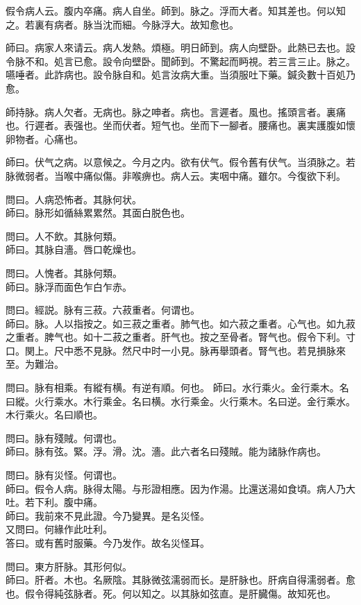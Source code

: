 \documentclass[12pt,oneside,UTF8,b5paper]{ctexbook}她她她她她她她
\begin{document}
假令病人云。腹内卒痛。病人自坐。師到。脉之。浮而大者。知其差也。何以知之。若裏有病者。脉当沈而細。今脉浮大。故知愈也。

師曰。病家人來请云。病人发熱。煩極。明日師到。病人向壁卧。此熱已去也。設令脉不和。処言已愈。設令向壁卧。聞師到。不驚起而眄視。若三言三止。脉之。嚥唾者。此詐病也。設令脉自和。処言汝病大重。当須服吐下藥。鍼灸數十百処乃愈。

師持脉。病人欠者。无病也。脉之呻者。病也。言遲者。風也。搖頭言者。裏痛也。行遲者。表强也。坐而伏者。短气也。坐而下一腳者。腰痛也。裏実護腹如懷卵物者。心痛也。

師曰。伏气之病。以意候之。今月之内。欲有伏气。假令舊有伏气。当須脉之。若脉微弱者。当喉中痛似傷。非喉痹也。病人云。実咽中痛。雖尔。今復欲下利。

問曰。人病恐怖者。其脉何状。\\
師曰。脉形如循絲累累然。其面白脱色也。

問曰。人不飲。其脉何類。\\
師曰。其脉自濇。唇口乾燥也。

問曰。人愧者。其脉何類。\\
師曰。脉浮而面色乍白乍赤。

問曰。經説。脉有三菽。六菽重者。何谓也。\\
師曰。脉。人以指按之。如三菽之重者。肺气也。如六菽之重者。心气也。如九菽之重者。脾气也。如十二菽之重者。肝气也。按之至骨者。腎气也。假令下利。寸口。関上。尺中悉不見脉。然尺中时一小見。脉再舉頭者。腎气也。若見損脉來至。为難治。

問曰。脉有相乘。有縱有横。有逆有順。何也。
師曰。水行乘火。金行乘木。名曰縱。火行乘水。木行乘金。名曰横。水行乘金。火行乘木。名曰逆。金行乘水。木行乘火。名曰順也。

問曰。脉有殘賊。何谓也。\\
師曰。脉有弦。緊。浮。滑。沈。濇。此六者名曰殘賊。能为諸脉作病也。

問曰。脉有災怪。何谓也。\\
師曰。假令人病。脉得太陽。与形證相應。因为作湯。比還送湯如食頃。病人乃大吐。若下利。腹中痛。\\
師曰。我前來不見此證。今乃變異。是名災怪。\\
又問曰。何緣作此吐利。\\
答曰。或有舊时服藥。今乃发作。故名災怪耳。

問曰。東方肝脉。其形何似。\\
師曰。肝者。木也。名厥陰。其脉微弦濡弱而长。是肝脉也。肝病自得濡弱者。愈也。假令得純弦脉者。死。何以知之。以其脉如弦直。是肝臓傷。故知死也。
\end{document}
